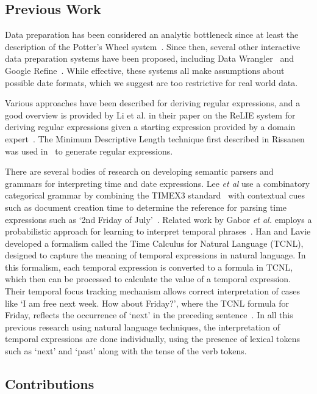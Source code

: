 \subsection{Previous Work}

Data preparation has been considered an analytic bottleneck since at least the description of the Potter's Wheel system~\cite{Raman:2001}. Since then, several other interactive data preparation systems have been proposed, including Data Wrangler~\cite{Kandel:2011} and Google Refine~\cite{Refine}. While effective, these systems all make assumptions about possible date formats, which we suggest are too restrictive for real world data.

Various approaches have been described for deriving regular expressions, and a good overview is provided by Li et al. in their paper on the ReLIE system for deriving regular expressions given a starting expression provided by a domain expert~\cite{Li:2008}. The Minimum Descriptive Length technique first described in Rissanen~\cite{Rissanen:1978} was used in~\cite{Raman:2001} to generate regular expressions. 

There are several bodies of research on developing semantic parsers and grammars for interpreting time and date expressions. Lee \textit{et al} use a combinatory categorical grammar by combining the TIMEX3 standard~\cite{timex3} with contextual cues such as document creation time to determine the reference for parsing time expressions such as `2nd Friday of July'~\cite{LeeADZ14}. Related work by Gabor \textit{et al.} employs a probabilistic approach for learning to interpret temporal phrases~\cite{Angeli:2012}. Han and Lavie developed a formalism called the Time Calculus for Natural Language (TCNL), designed to capture the meaning of temporal expressions in natural language. In this formalism, each temporal expression is converted to a formula in TCNL, which then can be processed to calculate the value of a temporal expression. Their temporal focus tracking mechanism allows correct interpretation of cases like `I am free next week. How
about Friday?', where the TCNL formula for Friday, reflects the occurrence of `next' in the preceding sentence~\cite{Han:2004}.  In all this previous research using natural language techniques, the interpretation of temporal expressions are done individually, using the presence of lexical tokens such as `next' and `past' along with the tense of the verb tokens.

\subsection{Contributions}

